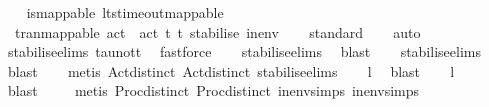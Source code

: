 \begin{isabellebody}
\begin{isamarkuptext}
\end{isamarkuptext}\isamarkuptrue%
%
\isadelimunimportant
%
\endisadelimunimportant
%
\isatagunimportant
%
\endisatagunimportant
{\isafoldunimportant}%
%
\isadelimunimportant
\ \ \isanewline
%
\endisadelimunimportant
{}\isamarkupfalse%
\ is{\isacharunderscore}{\kern0pt}mappable{\isacharcolon}{\kern0pt}\ {\isacartoucheopen}lts{\isacharunderscore}{\kern0pt}timeout{\isacharunderscore}{\kern0pt}mappable\ \isanewline
\ \ tran{\isacharunderscore}{\kern0pt}mappable\ {\isacharparenleft}{\kern0pt}act\ {\isasymtau}{\isacharparenright}{\kern0pt}\ {\isacharparenleft}{\kern0pt}act\ t{\isacharparenright}{\kern0pt}\ t{\isacharunderscore}{\kern0pt}{\isasymepsilon}\ stabilise\ in{\isacharunderscore}{\kern0pt}env{\isacartoucheclose}\isanewline
%
\isadelimproof
\ \ %
\endisadelimproof
%
\isatagproof
{}\isamarkupfalse%
\ standard\isanewline
\ \ \isamarkupfalse%
\ auto\ \isanewline
\ \ \isamarkupfalse%
\ stabilise{\isachardot}{\kern0pt}elims\ tau{\isacharunderscore}{\kern0pt}not{\isacharunderscore}{\kern0pt}t\ \isamarkupfalse%
\ fastforce\isanewline
\ \ \isamarkupfalse%
\ stabilise{\isachardot}{\kern0pt}elims\ \isamarkupfalse%
\ blast\isanewline
\ \ \isamarkupfalse%
\ stabilise{\isachardot}{\kern0pt}elims\ \isamarkupfalse%
\ blast\isanewline
\ \ \isamarkupfalse%
\ {\isacharparenleft}{\kern0pt}metis\ Act{\isacharunderscore}{\kern0pt}{\isasymtheta}{\isachardot}{\kern0pt}distinct{\isacharparenleft}{\kern0pt}{}{\isacharparenright}{\kern0pt}\ Act{\isacharunderscore}{\kern0pt}{\isasymtheta}{\isachardot}{\kern0pt}distinct{\isacharparenleft}{\kern0pt}{}{\isacharparenright}{\kern0pt}\ stabilise{\isachardot}{\kern0pt}elims{\isacharparenright}{\kern0pt}\isanewline
\ \ \isamarkupfalse%
\ l{}\ \isamarkupfalse%
\ blast\isanewline
\ \ \isamarkupfalse%
\ l{}\ \isamarkupfalse%
\ blast\ \isanewline
\ \ \isamarkupfalse%
\ {\isacharparenleft}{\kern0pt}metis\ Proc{\isacharunderscore}{\kern0pt}{\isasymtheta}{\isachardot}{\kern0pt}distinct{\isacharparenleft}{\kern0pt}{}{\isacharparenright}{\kern0pt}\ Proc{\isacharunderscore}{\kern0pt}{\isasymtheta}{\isachardot}{\kern0pt}distinct{\isacharparenleft}{\kern0pt}{}{\isacharparenright}{\kern0pt}\ in{\isacharunderscore}{\kern0pt}env{\isachardot}{\kern0pt}simps{\isacharparenleft}{\kern0pt}{}{\isacharparenright}{\kern0pt}\ in{\isacharunderscore}{\kern0pt}env{\isachardot}{\kern0pt}simps{\isacharparenleft}{\kern0pt}{}{\isacharparenright}{\kern0pt}{\isacharparenright}{\kern0pt}\isanewline

\end{isabellebody}
